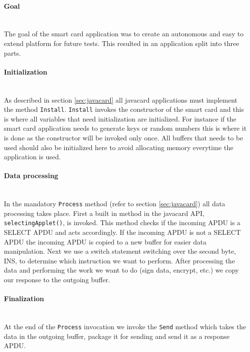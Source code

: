 \paragraph{Goal}\mbox{}\\
The goal of the smart card application was to create an autonomous and easy to extend platform for future tests. This resulted in an application split into three parts.

\paragraph{Initialization}\mbox{}\\
As described in section \ref{sec:javacard} all javacard applications must implement the method \texttt{Install}. \texttt{Install} invokes the constructor of the smart card and this is where all variables that need initialization are initialized. For instance if the smart card application needs to generate keys or random numbers this is where it is done as the constructor will be invoked only once. All buffers that needs to be used should also be initialized here to avoid allocating memory everytime the application is used.

\paragraph{Data processing}\mbox{}\\
In the mandatory \texttt{Process} method (refer to section \ref{sec:javacard}) all data processing takes place. First a built in method in the javacard API, \texttt{selectingApplet()}, is invoked. This method checks if the incoming APDU is a SELECT APDU and acts accordingly. If the incoming APDU is not a SELECT APDU the incoming APDU is copied to a new buffer for easier data manipulation. Next we use a switch statement switching over the second byte, INS, to determine which instruction we want to perform. After processing the data and performing the work we want to do (sign data, encrypt, etc.) we copy our response to the outgoing buffer.

\paragraph{Finalization}\mbox{}\\
At the end of the \texttt{Process} invocation we invoke the \texttt{Send} method which takes the data in the outgoing buffer, package it for sending and send it as a response APDU.

